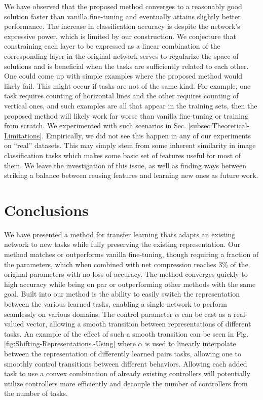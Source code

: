 \documentclass[10pt,journal,compsoc]{IEEEtran}
\begin{document}
We have observed that the proposed method converges to a reasonably
good solution faster than vanilla fine-tuning and eventually attains
slightly better performance. The increase in classification accuracy
is despite the network's expressive power, which is limited by our
construction. We conjecture that constraining each layer to be expressed
as a linear combination of the corresponding layer in the original
network serves to regularize the space of solutions and is beneficial
when the tasks are sufficiently related to each other. One could come
up with simple examples where the proposed method would likely fail.
This might occur if tasks are not of the same kind. For example, one
task requires counting of horizontal lines and the other requires
counting of vertical ones, and such examples are all that appear in
the training sets, then the proposed method will likely work far worse
than vanilla fine-tuning or training from scratch. We experimented
with such scenarios in Sec. \ref{subsec:Theoretical-Limitations}.
Empirically, we did not see this happen in any of our experiments
on ``real'' datasets. This may simply stem from some inherent similarity
in image classification tasks which makes some basic set of features
useful for most of them.  We leave the investigation of this issue,
as well as finding ways between striking a balance between reusing
features and learning new ones as future work. 

\section{Conclusions}

We have presented a method for transfer learning thats adapts an existing
network to new tasks while fully preserving the existing representation.
Our method matches or outperforms vanilla fine-tuning, though requiring
a fraction of the parameters, which when combined with net compression
reaches 3\% of the original parameters with no loss of accuracy. The
method converges quickly to high accuracy while being on par or outperforming
other methods with the same goal. Built into our method is the ability
to easily switch the representation between the various learned tasks,
enabling a single network to perform seamlessly on various domains.
The control parameter $\alpha$ can be cast as a real-valued vector,
allowing a smooth transition between representations of different
tasks. An example of the effect of such a smooth transition can be
seen in Fig. \ref{fig:Shifting-Representations.-Using} where $\alpha$
is used to linearly interpolate between the representation of differently
learned pairs tasks, allowing one to smoothly control transitions
between different behaviors. Allowing each added task to use a convex
combination of already existing controllers will potentially utilize
controllers more efficiently and decouple the number of controllers
from the number of tasks. 
\ifCLASSOPTIONcompsoc
\end{document}
